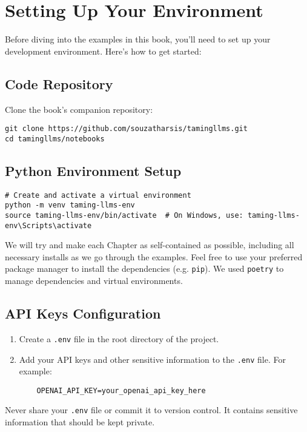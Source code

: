 \section{Setting Up Your Environment}

Before diving into the examples in this book, you'll need to set up your development environment. Here's how to get started:

\subsection{Code Repository}
Clone the book's companion repository:
\begin{verbatim}
git clone https://github.com/souzatharsis/tamingllms.git
cd tamingllms/notebooks
\end{verbatim}

\subsection{Python Environment Setup}
\begin{verbatim}
# Create and activate a virtual environment
python -m venv taming-llms-env
source taming-llms-env/bin/activate  # On Windows, use: taming-llms-env\Scripts\activate
\end{verbatim}

We will try and make each Chapter as self-contained as possible, including all necessary installs as we go through the examples.
Feel free to use your preferred package manager to install the dependencies (e.g. \texttt{pip}). We used \texttt{poetry} to manage dependencies and virtual environments.

\subsection{API Keys Configuration}
\begin{enumerate}
    \item Create a \texttt{.env} file in the root directory of the project.
    \item Add your API keys and other sensitive information to the \texttt{.env} file. For example:

    \begin{verbatim}
    OPENAI_API_KEY=your_openai_api_key_here
    \end{verbatim}
\end{enumerate}

\begin{kaobox}[frametitle=Note]
Never share your \texttt{.env} file or commit it to version control. It contains sensitive information that should be kept private.
\end{kaobox}

